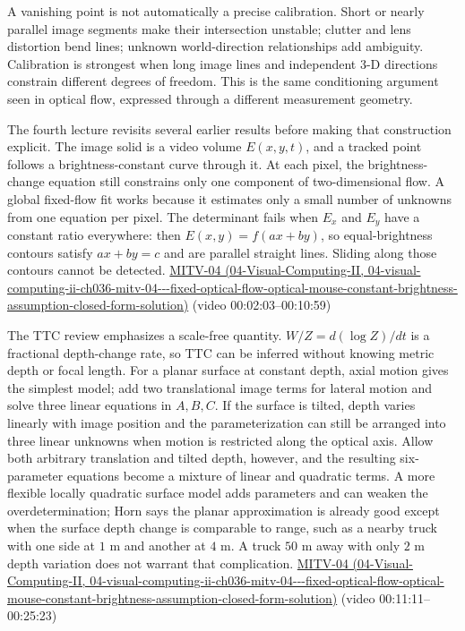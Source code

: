 A vanishing point is not automatically a precise calibration. Short or nearly parallel image segments make their intersection unstable; clutter and lens distortion bend lines; unknown world-direction relationships add ambiguity. Calibration is strongest when long image lines and independent 3-D directions constrain different degrees of freedom. This is the same conditioning argument seen in optical flow, expressed through a different measurement geometry.

The fourth lecture revisits several earlier results before making that construction explicit. The image solid is a video volume \(E(x,y,t)\), and a tracked point follows a brightness-constant curve through it. At each pixel, the brightness-change equation still constrains only one component of two-dimensional flow. A global fixed-flow fit works because it estimates only a small number of unknowns from one equation per pixel. The determinant fails when \(E_x\) and \(E_y\) have a constant ratio everywhere: then \(E(x,y)=f(ax+by)\), so equal-brightness contours satisfy \(ax+by=c\) and are parallel straight lines. Sliding along those contours cannot be detected. \href{../04-Visual-Computing-II/main.pdf\#nameddest=04-visual-computing-ii-ch036-mitv-04---fixed-optical-flow-optical-mouse-constant-brightness-assumption-closed-form-solution}{MITV-04 (04-Visual-Computing-II, 04-visual-computing-ii-ch036-mitv-04-\/-\/-fixed-optical-flow-optical-mouse-constant-brightness-assumption-closed-form-solution)} (video 00:02:03--00:10:59)

The TTC review emphasizes a scale-free quantity. \(W/Z=d(\log Z)/dt\) is a fractional depth-change rate, so TTC can be inferred without knowing metric depth or focal length. For a planar surface at constant depth, axial motion gives the simplest model; add two translational image terms for lateral motion and solve three linear equations in \(A,B,C\). If the surface is tilted, depth varies linearly with image position and the parameterization can still be arranged into three linear unknowns when motion is restricted along the optical axis. Allow both arbitrary translation and tilted depth, however, and the resulting six-parameter equations become a mixture of linear and quadratic terms. A more flexible locally quadratic surface model adds parameters and can weaken the overdetermination; Horn says the planar approximation is already good except when the surface depth change is comparable to range, such as a nearby truck with one side at \(1\) m and another at \(4\) m. A truck \(50\) m away with only \(2\) m depth variation does not warrant that complication. \href{../04-Visual-Computing-II/main.pdf\#nameddest=04-visual-computing-ii-ch036-mitv-04---fixed-optical-flow-optical-mouse-constant-brightness-assumption-closed-form-solution}{MITV-04 (04-Visual-Computing-II, 04-visual-computing-ii-ch036-mitv-04-\/-\/-fixed-optical-flow-optical-mouse-constant-brightness-assumption-closed-form-solution)} (video 00:11:11--00:25:23)

